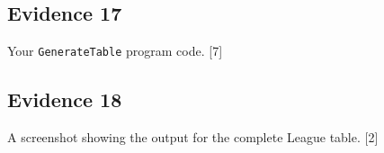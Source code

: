 \subsection*{Evidence 17 }

Your \texttt{GenerateTable} program code.\hfill{} {[}7{]}

\subsection*{Evidence 18 }

A screenshot showing the output for the complete League table.\hfill{}
{[}2{]}
